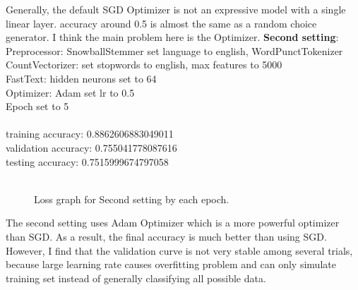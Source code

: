 \documentclass{article} %
\begin{document}
Generally, the default SGD Optimizer is not an expressive model with a single linear layer. accuracy around 0.5 is almost the same as a random choice generator. I think the main problem here is the Optimizer.
\noindent
\textbf{Second setting}:\\
Preprocessor: SnowballStemmer set language to english, WordPunctTokenizer\\
CountVectorizer: set stopwords to english, max features to 5000\\
FastText: hidden neurons set to 64\\
Optimizer: Adam set lr to 0.5\\
Epoch set to 5\\
\\
\noindent
training accuracy: 0.8862606883049011\\
validation accuracy: 0.755041778087616\\
testing accuracy: 0.7515999674797058\\
\begin{figure}[htp]
    \centering
    \\
Loss graph for Second setting by each epoch.   
    \end{figure}

The second setting uses Adam Optimizer which is a more powerful optimizer than SGD. As a result, the final accuracy is much better than using SGD. However, 
I find that the validation curve is not very stable among several trials, because large learning rate causes overfitting problem and can only simulate training set
instead of generally classifying all possible data.
\end{document}
